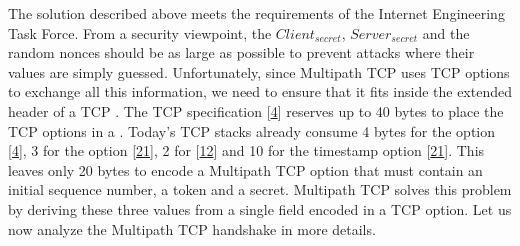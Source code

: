 \documentclass[letterpaper,10pt,english]{sphinxmanual}
\begin{document}
\sphinxAtStartPar
The solution described above meets the requirements of the Internet Engineering Task Force. From a security viewpoint, the \(Client_{secret}\), \(Server_{secret}\) and the random nonces should be as large as possible to prevent attacks where their values are simply guessed. Unfortunately, since Multipath TCP uses TCP options to exchange all this information, we need to ensure that it fits inside the extended header of a TCP . The TCP specification {[}\hyperlink{cite.biblio:id729}{4}{]} reserves up to 40 bytes to place the TCP options in a . Today’s TCP stacks already consume 4 bytes for the  option {[}\hyperlink{cite.biblio:id729}{4}{]}, 3 for the  option {[}\hyperlink{cite.biblio:id1255}{21}{]}, 2 for  {[}\hyperlink{cite.biblio:id1948}{12}{]} and 10 for the timestamp option {[}\hyperlink{cite.biblio:id1255}{21}{]}. This leaves only 20 bytes to encode a Multipath TCP option that must contain an initial sequence number, a token and a secret. Multipath TCP solves this problem by deriving these three values from a single field encoded in a TCP option. Let us now analyze the Multipath TCP handshake in more details.
\end{document}
